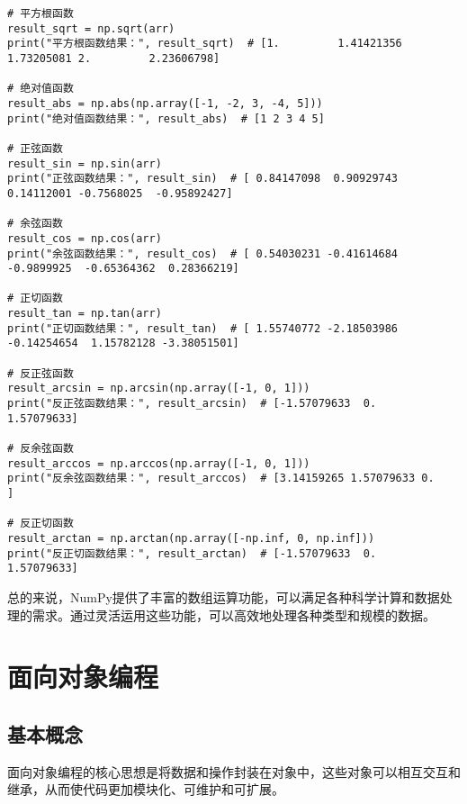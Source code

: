 \documentclass{article}
\begin{document}
\begin{itemize}
\begin{lstlisting}[caption={示例Python代码}]
# 平方根函数
result_sqrt = np.sqrt(arr)
print("平方根函数结果：", result_sqrt)  # [1.         1.41421356 1.73205081 2.         2.23606798]

# 绝对值函数
result_abs = np.abs(np.array([-1, -2, 3, -4, 5]))
print("绝对值函数结果：", result_abs)  # [1 2 3 4 5]

# 正弦函数
result_sin = np.sin(arr)
print("正弦函数结果：", result_sin)  # [ 0.84147098  0.90929743  0.14112001 -0.7568025  -0.95892427]

# 余弦函数
result_cos = np.cos(arr)
print("余弦函数结果：", result_cos)  # [ 0.54030231 -0.41614684 -0.9899925  -0.65364362  0.28366219]

# 正切函数
result_tan = np.tan(arr)
print("正切函数结果：", result_tan)  # [ 1.55740772 -2.18503986 -0.14254654  1.15782128 -3.38051501]

# 反正弦函数
result_arcsin = np.arcsin(np.array([-1, 0, 1]))
print("反正弦函数结果：", result_arcsin)  # [-1.57079633  0.          1.57079633]

# 反余弦函数
result_arccos = np.arccos(np.array([-1, 0, 1]))
print("反余弦函数结果：", result_arccos)  # [3.14159265 1.57079633 0.        ]

# 反正切函数
result_arctan = np.arctan(np.array([-np.inf, 0, np.inf]))
print("反正切函数结果：", result_arctan)  # [-1.57079633  0.          1.57079633]
 \end{lstlisting}

\end{itemize}
总的来说，NumPy提供了丰富的数组运算功能，可以满足各种科学计算和数据处理的需求。通过灵活运用这些功能，可以高效地处理各种类型和规模的数据。
\section{面向对象编程}
\subsection{基本概念}
面向对象编程的核心思想是将数据和操作封装在对象中，这些对象可以相互交互和继承，从而使代码更加模块化、可维护和可扩展。
\end{document}
